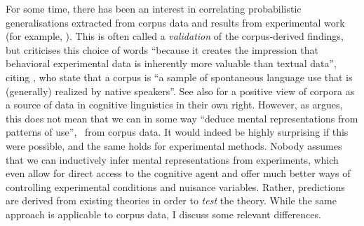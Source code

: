 For some time, there has been an interest in correlating probabilistic generalisations extracted from corpus data and results from experimental work (for example, \citealp{ArppeJaervikivi2007,BresnanEa2007,BresnanFord2010,DivjakGries2008,DivjakEa2016,FordBresnan2013}).
This is often called a \textit{validation} of the corpus-derived findings, but \citet[303]{Divjak2016a} criticises this choice of words ``because it creates the impression that behavioral experimental data is inherently more valuable than textual data'', citing \cite{TummersEa2005}, who state that a corpus is ``a sample of spontaneous language use that is (generally) realized by native speakers''.
See also \citet{Newman2011} for a positive view of corpora as a source of data in cognitive linguistics in their own right.
However, as \citet[486--487]{Dabrowska2016} argues, this does not mean that we can in some way ``deduce mental representations from patterns of use'', \ie\ from corpus data.
It would indeed be highly surprising if this were possible, and the same holds for experimental methods.
Nobody assumes that we can inductively infer mental representations from experiments, which even allow for direct access to the cognitive agent and offer much better ways of controlling experimental conditions and nuisance variables.
Rather, predictions are derived from existing theories in order to \textit{test} the theory.
While the same approach is applicable to corpus data, I discuss some relevant differences.

